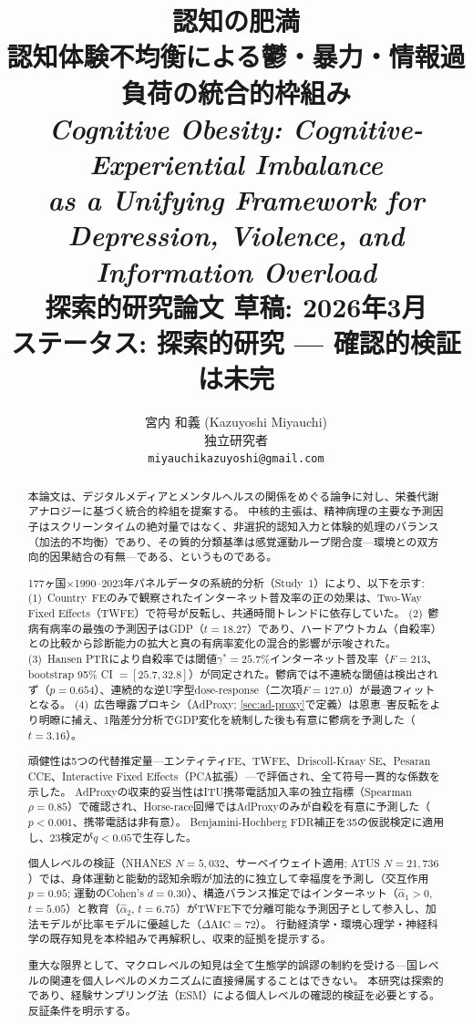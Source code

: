\documentclass[a4paper,11pt,titlepage]{article}
\title{%
  \vspace{-2cm}
  {\LARGE\bfseries 認知の肥満}\\[6pt]
  {\large 認知体験不均衡による鬱・暴力・情報過負荷の統合的枠組み}\\[12pt]
  {\normalsize\itshape Cognitive Obesity: Cognitive-Experiential Imbalance\\
   as a Unifying Framework for Depression, Violence, and Information Overload}\\[12pt]
  {\small 探索的研究論文 \quad 草稿: 2026年3月}\\
  {\small\color{red} ステータス: 探索的研究 --- 確認的検証は未完}
}
\author{宮内 和義 (Kazuyoshi Miyauchi)\\独立研究者\\
  \texttt{miyauchikazuyoshi@gmail.com}}
\date{}
\begin{document}
\maketitle
\thispagestyle{empty}

\begin{abstract}
\noindent
本論文は、デジタルメディアとメンタルヘルスの関係をめぐる論争に対し、栄養代謝アナロジーに基づく統合的枠組を提案する。
中核的主張は、精神病理の主要な予測因子はスクリーンタイムの絶対量ではなく、非選択的認知入力と体験的処理のバランス（加法的不均衡）であり、その質的分類基準は感覚運動ループ閉合度---環境との双方向的因果結合の有無---である、というものである。

177ヶ国$\times$1990--2023年パネルデータの系統的分析（Study~1）により、以下を示す:
(1)~Country~FEのみで観察されたインターネット普及率の正の効果は、Two-Way Fixed Effects（TWFE）で符号が反転し、共通時間トレンドに依存していた。
(2)~鬱病有病率の最強の予測因子はGDP（$t=18.27$）であり、ハードアウトカム（自殺率）との比較から診断能力の拡大と真の有病率変化の混合的影響が示唆された。
(3)~Hansen PTRにより自殺率では閾値$\gamma^*=25.7\%$インターネット普及率（$F=213$、bootstrap 95\% CI $= [25.7, 32.8]$）が同定された。鬱病では不連続な閾値は検出されず（$p=0.654$）、連続的な逆U字型dose-response（二次項$F=127.0$）が最適フィットとなる。
(4)~広告曝露プロキシ（AdProxy; \cref{sec:ad-proxy}で定義）は恩恵--害反転をより明瞭に捕え、1階差分分析でGDP変化を統制した後も有意に鬱病を予測した（$t=3.16$）。

頑健性は5つの代替推定量---エンティティFE、TWFE、Driscoll-Kraay SE、Pesaran CCE、Interactive Fixed Effects（PCA拡張）---で評価され、全て符号一貫的な係数を示した。
AdProxyの収束的妥当性はITU携帯電話加入率の独立指標（Spearman $\rho=0.85$）で確認され、Horse-race回帰ではAdProxyのみが自殺を有意に予測した（$p<0.001$、携帯電話は非有意）。
Benjamini-Hochberg FDR補正を35の仮説検定に適用し、23検定が$q<0.05$で生存した。

個人レベルの検証（NHANES $N=5{,}032$、サーベイウェイト適用; ATUS $N=21{,}736$）では、身体運動と能動的認知余暇が加法的に独立して幸福度を予測し（交互作用$p=0.95$; 運動のCohen's $d=0.30$）、構造バランス推定ではインターネット（$\hat{\alpha}_1>0$, $t=5.05$）と教育（$\hat{\alpha}_2$, $t=6.75$）がTWFE下で分離可能な予測因子として参入し、加法モデルが比率モデルに優越した（$\Delta\text{AIC}=72$）。
行動経済学・環境心理学・神経科学の既存知見を本枠組みで再解釈し、収束的証拠を提示する。

重大な限界として、マクロレベルの知見は全て生態学的誤謬の制約を受ける---国レベルの関連を個人レベルのメカニズムに直接帰属することはできない。
本研究は探索的であり、経験サンプリング法（ESM）による個人レベルの確認的検証を必要とする。反証条件を明示する。
\end{abstract}
\end{document}
